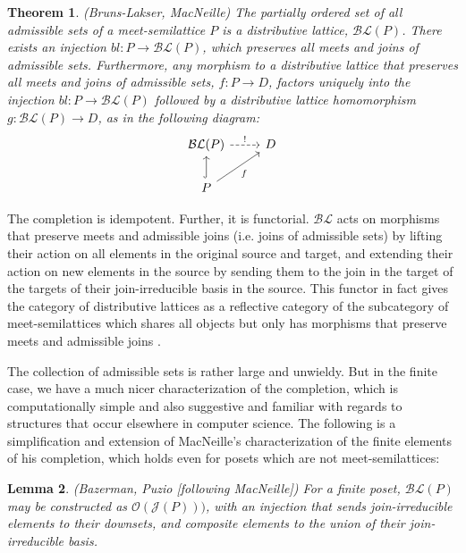 \documentclass[hoptionsi,review,format=acmsmall]{acmart}
\newtheorem{theorem}{Theorem}[section]
\newtheorem{lemma}[theorem]{Lemma}
\theoremstyle{definition}
\newcommand{\Oc}{\mathcal{O}}
\newcommand{\Jc}{\mathcal{J}}
\newcommand{\BLc}{\mathcal{BL}}
\begin{document}
\begin{theorem}
(Bruns-Lakser, MacNeille) The partially ordered set of all admissible sets of a meet-semilattice \(P\) is a distributive lattice, \(\BLc(P)\). There exists an injection \(bl : P \rightarrow \BLc(P)\), which preserves all meets and joins of admissible sets. Furthermore, any morphism to a distributive lattice that preserves all meets and joins of admissible sets, \(f : P \rightarrow D\), factors uniquely into the injection \(bl : P \rightarrow \BLc(P)\) followed by a distributive lattice homomorphism \(g : \BLc(P) \rightarrow D\), as in the following diagram:
\begin{equation*}
\begin{tikzcd}
\BLc(P) \arrow[r, "!",dashed]            & D \\
P \arrow[u, hook] \arrow[ru, "f"'] &
\end{tikzcd}
\end{equation*}

\end{theorem}

The completion is idempotent. Further, it is functorial. \(\BLc\) acts on morphisms that preserve meets and admissible joins (i.e. joins of admissible sets) by lifting their action on all elements in the original source and target, and extending their action on new elements in the source by sending them to the join in the target of the targets of their join-irreducible basis in the source. This functor in fact gives the category of distributive lattices as a reflective category of the subcategory of meet-semilattices which shares all objects but only has morphisms that preserve meets and admissible joins \cite{gehrke2014distributive}. 


The collection of admissible sets is rather large and unwieldy. But in the finite case, we have a much nicer characterization of the completion, which is computationally simple and also suggestive and familiar with regards to structures that occur elsewhere in computer science. The following is a simplification and extension of MacNeille's characterization of the finite elements of his completion, which holds even for posets which are not meet-semilattices:

\begin{lemma}
(Bazerman, Puzio [following MacNeille]) For a finite poset, \(\BLc(P)\) may be constructed as \(\Oc(\Jc(P)))\), with an injection that sends join-irreducible elements to their downsets, and composite elements to the union of their join-irreducible basis.
\end{lemma}
\end{document}
